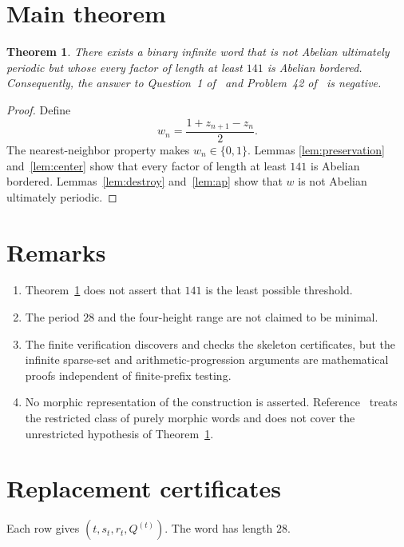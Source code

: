 \documentclass[11pt]{article}
\newtheorem{theorem}{Theorem}[section]
\begin{document}
\section{Main theorem}

\begin{theorem}\label{thm:main}
There exists a binary infinite word that is not Abelian ultimately periodic
but whose every factor of length at least $141$ is Abelian bordered.
Consequently, the answer to Question~1 of~\cite{CHPZ} and Problem~42
of~\cite{FP} is negative.
\end{theorem}

\begin{proof}
Define
\[
w_n=\frac{1+z_{n+1}-z_n}{2}.
\]
The nearest-neighbor property makes $w_n\in\{0,1\}$. Lemmas
\ref{lem:preservation} and~\ref{lem:center} show that every factor of length
at least $141$ is Abelian bordered. Lemmas~\ref{lem:destroy} and~\ref{lem:ap}
show that $w$ is not Abelian ultimately periodic.
\end{proof}

\section{Remarks}

\begin{enumerate}
\item Theorem~\ref{thm:main} does not assert that $141$ is the least possible
threshold.
\item The period $28$ and the four-height range are not claimed to be
minimal.
\item The finite verification discovers and checks the skeleton certificates,
but the infinite sparse-set and arithmetic-progression arguments are
mathematical proofs independent of finite-prefix testing.
\item No morphic representation of the construction is asserted.
Reference~\cite{FilimonovaPuzynina} treats the restricted class of purely
morphic words and does not cover the unrestricted hypothesis of
Theorem~\ref{thm:main}.
\end{enumerate}

\appendix
\section{Replacement certificates}\label{app:certificates}

Each row gives $(t,s_t,r_t,Q^{(t)})$. The word has length $28$.
\end{document}
